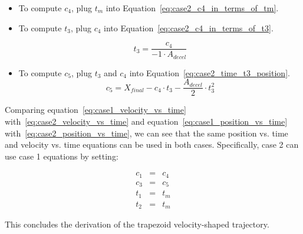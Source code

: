 \documentclass[11pt]{article} %
\begin{document}
\begin{itemize}
\item To compute $c_4$, plug $t_m$ into Equation~\ref{eq:case2_c4_in_terms_of_tm}.
\item To compute $t_3$, plug $c_4$ into Equation~\ref{eq:case2_c4_in_terms_of_t3}.

\begin{equation}
t_3 = \frac{c_4}{-1 \cdot A_{decel}}
\end{equation}

\item To compute $c_5$, plug $t_3$ and $c_4$ into Equation~\ref{eq:case2_time_t3_position}.
\begin{equation}
c_5 = X_{final} - c_4 \cdot t_3 - \frac{A_{decel}}{2} \cdot t_3^2
\end{equation}

\end{itemize}

\noindent Comparing equation~\ref{eq:case1_velocity_vs_time} with~\ref{eq:case2_velocity_vs_time} and equation~\ref{eq:case1_position_vs_time} with~\ref{eq:case2_position_vs_time}, we can see that the same position vs. time and velocity vs. time equations can be used in both cases. Specifically, case 2 can use case 1 equations by setting:

\begin{eqnarray}
c_1 & = & c_4\\
c_3 & = & c_5\\
t_1  & = & t_m\\
t_2 & = & t_m
\end{eqnarray}

\noindent This concludes the derivation of the trapezoid velocity-shaped trajectory.
\end{document}
